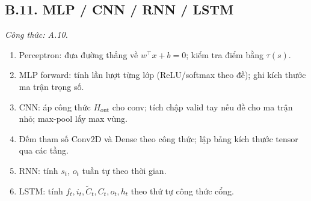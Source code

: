 \subsection*{B.11. MLP / CNN / RNN / LSTM}
\textit{Công thức: A.10.}
\begin{enumerate}
  \item Perceptron: đưa đường thẳng về \(w^\top x+b=0\); kiểm tra điểm bằng \(\tau(s)\).
  \item MLP forward: tính lần lượt từng lớp (ReLU/softmax theo đề); ghi kích thước ma trận trọng số.
  \item CNN: áp công thức \(H_{\mathrm{out}}\) cho conv; tích chập valid tay nếu đề cho ma trận nhỏ; max-pool lấy max vùng.
  \item Đếm tham số Conv2D và Dense theo công thức; lập bảng kích thước tensor qua các tầng.
  \item RNN: tính \(s_t\), \(o_t\) tuần tự theo thời gian.
  \item LSTM: tính \(f_t,i_t,\tilde C_t,C_t,o_t,h_t\) theo thứ tự công thức cổng.
\end{enumerate}
